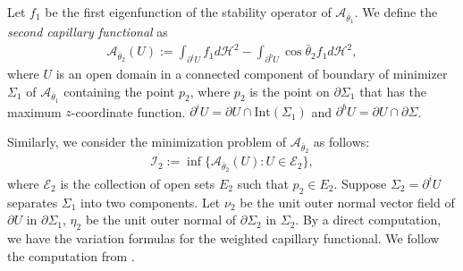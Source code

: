 \documentclass[11pt,letterpaper]{amsart}
\begin{document}
Let $f_1$ be the first eigenfunction of the stability operator of $\mathcal A_{\bar{\theta}_1}$. We define the \textit{second capillary functional} as 
\begin{align}
\mathcal A_{\bar{\theta}_2}(U):=\int_{\partial^i U}f_1d\mathcal H^2-\int_{\partial^b U}\cos\bar{\theta}_2f_1d\mathcal H^2,
\end{align}
where $U$ is an open domain in a connected component of boundary of minimizer $\Sigma_1$ of $\mathcal{A_{\bar{\theta}_1}}$ containing the point $p_2$, where $p_2$ is the point on $\partial \Sigma_1$ that has the maximum $z$-coordinate function. $\partial^i U=\partial U\cap \text{Int}(\Sigma_1)$ and $\partial^b U=\partial U\cap \partial \Sigma$.

Similarly, we consider the minimization problem of $\mathcal A_{\bar{\theta}_2}$ as follows:
\begin{align}
    \mathcal I_2:=\inf\{\mathcal A_{\bar{\theta}_2}(U): U\in\mathcal E_2\},
\end{align}
where $\mathcal E_2$ is the collection of open sets $E_2$ such that $p_2\in E_2$. Suppose $\Sigma_2=\partial^i U$ separates $\Sigma_1$ into two components. Let $\nu_2$ be the unit outer normal vector field of $\partial U$ in $\partial\Sigma_1$, $\eta_2$ be the unit outer normal of $\partial\Sigma_2$ in $\Sigma_2$. By a direct computation, we have the variation formulas for the weighted capillary functional. We follow the computation from \cite{wu2025rigidity}. 
\end{document}
